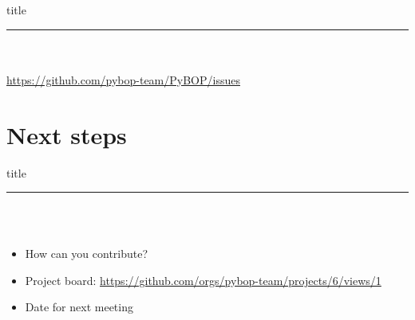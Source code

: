 \documentclass[aspectratio=169]{beamer} %
\begin{document}
\begin{frame}[plain]
    \centering
    \begin{beamercolorbox}[sep=8pt,center,shadow=true,rounded=true]{title}
    \par%
    \color{oxfordblue}\noindent\rule{10cm}{1pt} \\
    \LARGE{\faBug} \\
    \vspace{6mm} \normalsize
    \href{https://github.com/pybop-team/PyBOP/issues}{https://github.com/pybop-team/PyBOP/issues}
    \end{beamercolorbox}
\end{frame}


\section{Next steps}
\begin{frame}[plain]
    \centering
    \begin{beamercolorbox}[sep=8pt,center,shadow=true,rounded=true]{title}
    \par%
    \color{oxfordblue}\noindent\rule{10cm}{1pt} \\
    \LARGE{\faCalendarPlusO} \\
    \normalsize
    \vspace{1em}
    \begin{itemize}
        \item How can you contribute?
        \item Project board: \href{https://github.com/orgs/pybop-team/projects/6/views/1}{https://github.com/orgs/pybop-team/projects/6/views/1}
        \item Date for next meeting
    \end{itemize}
    \end{beamercolorbox}
\end{frame}
\end{document}
